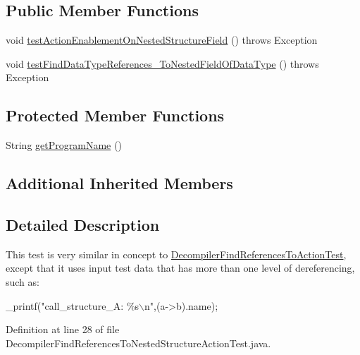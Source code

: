 \subsection*{Public Member Functions}
\begin{DoxyCompactItemize}
\item 
void \mbox{\hyperlink{classghidra_1_1app_1_1plugin_1_1core_1_1decompile_1_1_decompiler_find_references_to_nested_structure_action_test_a9eaa870ca9125e4731c429ce8eb49742}{test\+Action\+Enablement\+On\+Nested\+Structure\+Field}} ()  throws Exception 
\item 
void \mbox{\hyperlink{classghidra_1_1app_1_1plugin_1_1core_1_1decompile_1_1_decompiler_find_references_to_nested_structure_action_test_ad31c616b6ebca3744f23292f3f6a47a2}{test\+Find\+Data\+Type\+References\+\_\+\+To\+Nested\+Field\+Of\+Data\+Type}} ()  throws Exception 
\end{DoxyCompactItemize}
\subsection*{Protected Member Functions}
\begin{DoxyCompactItemize}
\item 
String \mbox{\hyperlink{classghidra_1_1app_1_1plugin_1_1core_1_1decompile_1_1_decompiler_find_references_to_nested_structure_action_test_af6b7b5fb04d252f8d79decb349972f82}{get\+Program\+Name}} ()
\end{DoxyCompactItemize}
\subsection*{Additional Inherited Members}


\subsection{Detailed Description}
This test is very similar in concept to \mbox{\hyperlink{classghidra_1_1app_1_1plugin_1_1core_1_1decompile_1_1_decompiler_find_references_to_action_test}{Decompiler\+Find\+References\+To\+Action\+Test}}, except that it uses input test data that has more than one level of dereferencing, such as\+: 
\begin{DoxyPre}
    \_printf("call\_structure\_A: \%s\(\backslash\)n",(a->b).name);
\end{DoxyPre}
 

Definition at line 28 of file Decompiler\+Find\+References\+To\+Nested\+Structure\+Action\+Test.\+java.



